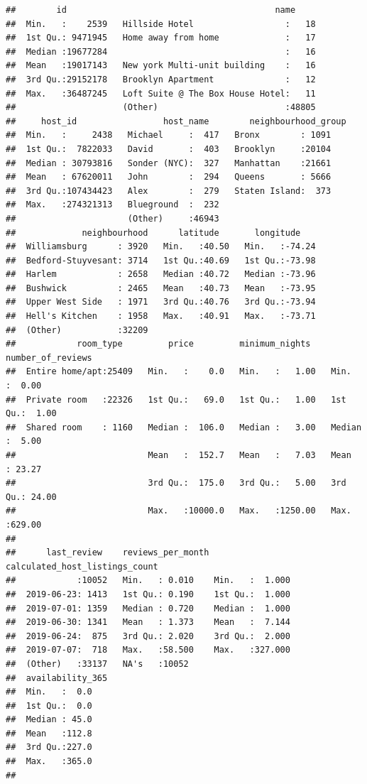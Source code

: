 \documentclass[
]{article}
\begin{document}
\begin{verbatim}
##        id                                         name      
##  Min.   :    2539   Hillside Hotel                  :   18  
##  1st Qu.: 9471945   Home away from home             :   17  
##  Median :19677284                                   :   16  
##  Mean   :19017143   New york Multi-unit building    :   16  
##  3rd Qu.:29152178   Brooklyn Apartment              :   12  
##  Max.   :36487245   Loft Suite @ The Box House Hotel:   11  
##                     (Other)                         :48805  
##     host_id                 host_name        neighbourhood_group
##  Min.   :     2438   Michael     :  417   Bronx        : 1091   
##  1st Qu.:  7822033   David       :  403   Brooklyn     :20104   
##  Median : 30793816   Sonder (NYC):  327   Manhattan    :21661   
##  Mean   : 67620011   John        :  294   Queens       : 5666   
##  3rd Qu.:107434423   Alex        :  279   Staten Island:  373   
##  Max.   :274321313   Blueground  :  232                         
##                      (Other)     :46943                         
##             neighbourhood      latitude       longitude     
##  Williamsburg      : 3920   Min.   :40.50   Min.   :-74.24  
##  Bedford-Stuyvesant: 3714   1st Qu.:40.69   1st Qu.:-73.98  
##  Harlem            : 2658   Median :40.72   Median :-73.96  
##  Bushwick          : 2465   Mean   :40.73   Mean   :-73.95  
##  Upper West Side   : 1971   3rd Qu.:40.76   3rd Qu.:-73.94  
##  Hell's Kitchen    : 1958   Max.   :40.91   Max.   :-73.71  
##  (Other)           :32209                                   
##            room_type         price         minimum_nights    number_of_reviews
##  Entire home/apt:25409   Min.   :    0.0   Min.   :   1.00   Min.   :  0.00   
##  Private room   :22326   1st Qu.:   69.0   1st Qu.:   1.00   1st Qu.:  1.00   
##  Shared room    : 1160   Median :  106.0   Median :   3.00   Median :  5.00   
##                          Mean   :  152.7   Mean   :   7.03   Mean   : 23.27   
##                          3rd Qu.:  175.0   3rd Qu.:   5.00   3rd Qu.: 24.00   
##                          Max.   :10000.0   Max.   :1250.00   Max.   :629.00   
##                                                                               
##      last_review    reviews_per_month calculated_host_listings_count
##            :10052   Min.   : 0.010    Min.   :  1.000               
##  2019-06-23: 1413   1st Qu.: 0.190    1st Qu.:  1.000               
##  2019-07-01: 1359   Median : 0.720    Median :  1.000               
##  2019-06-30: 1341   Mean   : 1.373    Mean   :  7.144               
##  2019-06-24:  875   3rd Qu.: 2.020    3rd Qu.:  2.000               
##  2019-07-07:  718   Max.   :58.500    Max.   :327.000               
##  (Other)   :33137   NA's   :10052                                   
##  availability_365
##  Min.   :  0.0   
##  1st Qu.:  0.0   
##  Median : 45.0   
##  Mean   :112.8   
##  3rd Qu.:227.0   
##  Max.   :365.0   
## 
\end{verbatim}
\end{document}
